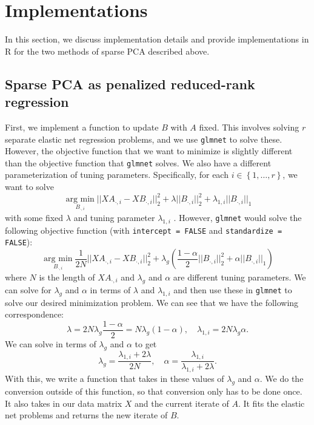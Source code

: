 \documentclass[11pt]{article}
\newcommand{\argmin}{\operatorname*{arg \ min}}
\begin{document}
\section{Implementations}
In this section, we discuss implementation details and provide implementations in R for the two methods of sparse PCA described above. 

\subsection{Sparse PCA as penalized reduced-rank regression}
First, we implement a function to update $B$ with $A$ fixed. This involves solving $r$ separate elastic net regression problems, and we use \texttt{glmnet} to solve these. However, the objective function that we want to minimize is slightly different than the objective function that \texttt{glmnet} solves. We also have a different parameterization of tuning parameters. Specifically, for each $i \in \left\{1, \dots, r \right\}$, we want to solve
$$
\argmin_{B_{\cdot, i}} ||XA_{\cdot, i} - XB_{\cdot, i}||_2^2 + \lambda||B_{\cdot, i}||_2^2 + \lambda_{1,  i}||B_{\cdot, i}||_1
$$ with some fixed $\lambda$ and tuning parameter $\lambda_{1, i}$ . However, \texttt{glmnet} would solve the following objective function (with \texttt{intercept = FALSE} and \texttt{standardize = FALSE}):
$$
\argmin_{B_{\cdot, i}} \frac{1}{2N}||XA_{\cdot, i} - XB_{\cdot, i}||_2^2 + \lambda_g \left(\frac{1 - \alpha}{2} ||B_{\cdot, i}||_2^2 + \alpha ||B_{\cdot, i}||_1 \right)
$$
where $N$ is the length of $XA_{\cdot, i}$ and $\lambda_g$ and $\alpha$ are different tuning parameters. We can solve for $\lambda_g$ and $\alpha$ in terms of $\lambda$ and $\lambda_{1, i}$ and then use these in \texttt{glmnet} to solve our desired minimization problem. We can see that we have the following correspondence:
$$
\lambda = 2N \lambda_g \frac{1 - \alpha}{2} = N \lambda_g (1 - \alpha), \quad \lambda_{1, i} = 2N \lambda_g \alpha.
$$
We can solve in terms of $\lambda_g$ and $\alpha$ to get
$$
\lambda_g = \frac{\lambda_{1, i} + 2 \lambda}{2N}, \quad \alpha = \frac{\lambda_{1, i}}{\lambda_{1, i} + 2\lambda}.
$$
With this, we write a function that takes in these values of $\lambda_g$ and $\alpha$. We do the conversion outside of this function, so that conversion only has to be done once. It also takes in our data matrix $X$ and the current iterate of $A$. It fits the elastic net problems and returns the new iterate of $B$. 


\end{document}
